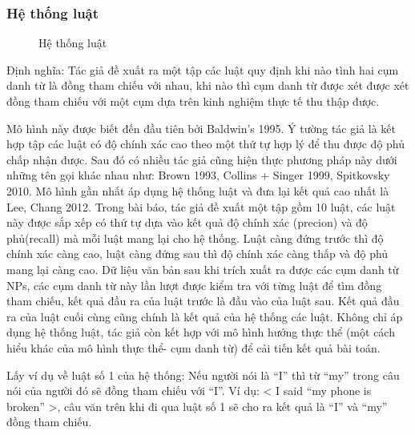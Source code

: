 \documentclass[12pt]{extarticle}
\begin{document}
				\subsubsection*{Hệ thống luật}
					\begin{figure}
						\centering
						
						\caption{Hệ thống luật}
					\end{figure}
					\par Định nghĩa: Tác giả đề xuất ra một tập các luật quy định khi nào tình hai cụm danh từ là đồng tham chiếu với nhau, khi nào thì cụm danh từ được xét được xét đồng tham chiếu với một cụm dựa trên kinh nghiệm thực tế thu thập được.
					\par Mô hình này được biết đến đầu tiên bởi Baldwin’s 1995. Ý tường tác giả là kết hợp tập các luật có độ chính xác cao theo một thứ tự hợp lý để thu được độ phủ chấp nhận được. Sau đó có nhiều tác giả cũng hiện thực phương pháp này dưới những tên gọi khác nhau như: Brown 1993, Collins + Singer 1999, Spitkovsky 2010. Mô hình gần nhất áp dụng hệ thống luật và đưa lại kết quả cao nhất là Lee, Chang 2012. Trong bài báo, tác giả đề xuất một tập gồm 10 luật, các luật này được sắp xếp có thứ tự dựa vào kết quả độ chính xác (precion) và độ phủ(recall) mà mỗi luật mang lại cho hệ thống. Luật càng đứng trước thì độ chính xác càng cao, luật càng đứng sau thì độ chính xác càng thấp và độ phủ mang lại càng cao. Dữ liệu văn bản sau khi trích xuất ra được các cụm danh từ NPs, các cụm danh từ này lần lượt được kiểm tra với từng luật để tìm đồng tham chiếu, kết quả đầu ra của luật trước là đầu vào của luật sau. Kết quả đầu ra của luật cuối cùng cũng chính là kết quả của hệ thống các luật. Không chỉ áp dụng hệ thống luật, tác giả còn kết hợp với mô hình hướng thực thể (một cách hiểu khác của mô hình thực thể- cụm danh từ) để cải tiến kết quả bài toán.					
					\par Lấy ví dụ về luật số 1 của hệ thống: Nếu người nói là “I” thì từ “my” trong câu nói của người đó sẽ đồng tham chiếu với “I”. Ví dụ: < I said “my phone is broken” >, câu văn trên khi đi qua luật số 1 sẽ cho ra kết quả là “I” và “my” đồng tham chiếu.
\end{document}
